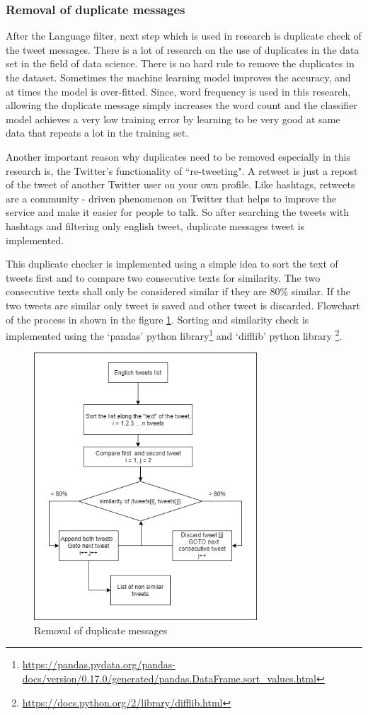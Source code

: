 \subsubsection{Removal of duplicate messages}
After the Language filter, next step which is used in research is duplicate check of the tweet messages. There is a lot of research on the use of duplicates in the data set in the field of data science. There is no hard rule to remove the duplicates in the dataset. Sometimes the machine learning model improves the accuracy, and at times  the model is over-fitted. Since, word frequency is used in this research, allowing the duplicate message simply increases the word count and the classifier model
achieves a very low training error by learning to be very good at same data that repeats a lot in the training set.

Another important reason why duplicates need to be removed especially in this research is, the Twitter's functionality of ``re-tweeting". A retweet is just a repost of the tweet of another Twitter user on your own profile. Like hashtags, retweets are a community - driven phenomenon on Twitter that helps to improve the service and make it easier for people to talk. So after searching the tweets with hashtags and filtering only english tweet, duplicate messages tweet is implemented.

This duplicate checker is implemented using a simple idea to sort the text of tweets first and to compare two consecutive texts for similarity. The two consecutive texts shall only be considered similar if they are 80\% similar. If the two tweets are similar only tweet is saved and other tweet is discarded. Flowchart of the process in shown in the figure \ref{fig:duplicatechk}. Sorting and similarity check is implemented using the `pandas' python library\footnote{\url{https://pandas.pydata.org/pandas-docs/version/0.17.0/generated/pandas.DataFrame.sort_values.html}} and `difflib' python library \footnote{\url{https://docs.python.org/2/library/difflib.html}}.

\begin{figure}
	\centering
	\includegraphics[width=10cm\linewidth,height=10cm]{thesis_template/images/duplicatecheck.png}
	\caption{Removal of duplicate messages}
	\label{fig:duplicatechk}
\end{figure}

